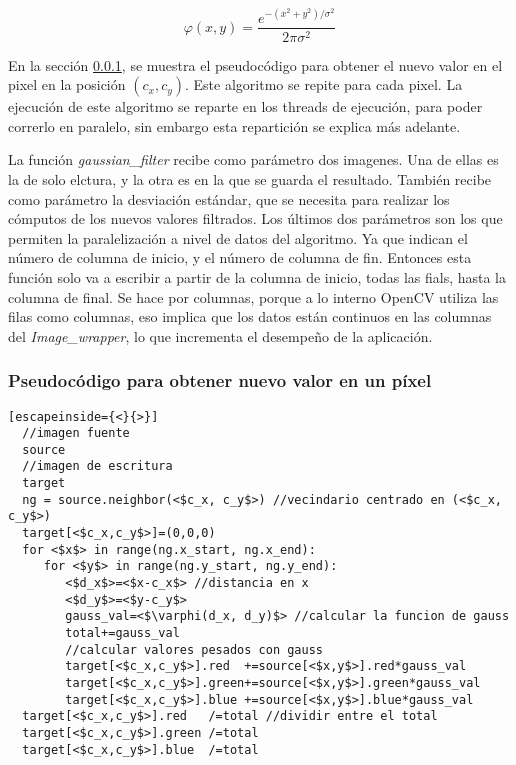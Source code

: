 \documentclass {article}
\begin{document}
\begin{equation}
  \varphi (x, y)= \frac{e^{-(x^2+y^2)/\sigma^2}}{2\pi \sigma^2} 
  \label{eq:bidiGauss}
\end{equation}

En la sección \ref{sec:pseudocodePixel}, se muestra el pseudocódigo para obtener el nuevo valor en
el pixel en la posición $(c_x, c_y)$. Este algoritmo se repite para cada pixel. La ejecución de este
algoritmo se reparte en los threads de ejecución, para poder correrlo en paralelo, sin embargo esta
repartición  se explica más adelante.

La función \textit{gaussian\_filter} recibe como parámetro dos imagenes. Una de ellas es la de solo
elctura, y la otra es en la que se guarda el resultado. También recibe como parámetro la desviación
estándar, que se necesita para realizar los cómputos de los nuevos valores filtrados. Los últimos
dos parámetros son los que permiten la paralelización a nivel de datos del algoritmo. Ya que indican
el número de columna de inicio, y el número de columna de fin. Entonces esta función solo va a
escribir a partir de la columna de inicio, todas las fials, hasta la columna de final. Se hace por
columnas, porque a lo interno OpenCV utiliza las filas como columnas, eso implica que los datos
están continuos en las columnas del \textit{Image\_wrapper}, lo que incrementa el desempeño de la
aplicación.  


\subsubsection{Pseudocódigo para obtener nuevo valor en un píxel}
\label{sec:pseudocodePixel}
\begin{lstlisting}[escapeinside={<}{>}]
  //imagen fuente
  source
  //imagen de escritura
  target
  ng = source.neighbor(<$c_x, c_y$>) //vecindario centrado en (<$c_x, c_y$>)
  target[<$c_x,c_y$>]=(0,0,0)
  for <$x$> in range(ng.x_start, ng.x_end):
     for <$y$> in range(ng.y_start, ng.y_end):
        <$d_x$>=<$x-c_x$> //distancia en x
        <$d_y$>=<$y-c_y$>
        gauss_val=<$\varphi(d_x, d_y)$> //calcular la funcion de gauss
        total+=gauss_val
        //calcular valores pesados con gauss
        target[<$c_x,c_y$>].red  +=source[<$x,y$>].red*gauss_val 
        target[<$c_x,c_y$>].green+=source[<$x,y$>].green*gauss_val
        target[<$c_x,c_y$>].blue +=source[<$x,y$>].blue*gauss_val
  target[<$c_x,c_y$>].red   /=total //dividir entre el total
  target[<$c_x,c_y$>].green /=total
  target[<$c_x,c_y$>].blue  /=total
        
\end{lstlisting}
\end{document}
